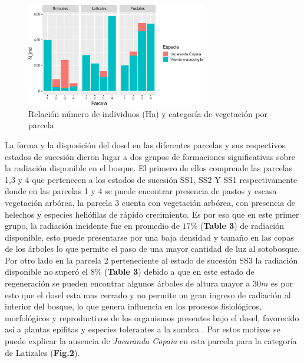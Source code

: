 \documentclass[letterpaper,9pt,onecolumn,twoside,]{pinp}
\begin{document}
\begin{figure}

{\centering \includegraphics[width=0.7\textwidth]{report_ecology_files/figure-latex/unnamed-chunk-10-1} 

}

\caption{Relación número de individuos (Ha) y categoría de vegetación por parcela}\label{fig:unnamed-chunk-10}
\end{figure}

La forma y la disposición del dosel en las diferentes parcelas y sus
respectivos estados de sucesión dieron lugar a dos grupos de formaciones
significativas sobre la radiación disponible en el bosque. El primero de
ellos comprende las parcelas 1,3 y 4 que pertenecen a los estados de
sucesión SS1, SS2 Y SS1 respectivamente donde en las parcelas 1 y 4 se
puede encontrar presencia de pastos y escasa vegetación arbórea, la
parcela 3 cuenta con vegetación arbórea, con presencia de helechos y
especies heliófilas de rápido crecimiento. Es por eso que en este primer
grupo, la radiación incidente fue en promedio de \(17 \%\)
(\textbf{Table 3}) de radiación disponible, esto puede presentarse por
una baja densidad y tamaño en las copas de los árboles\citep{plateros}
lo que permite el paso de una mayor cantidad de luz al sotobosque. Por
otro lado en la parcela 2 perteneciente al estado de sucesión SS3 la
radiación disponible no superó el \(8 \%\) (\textbf{Table 3}) debido a
que en este estado de regeneración se pueden encontrar algunos árboles de
altura mayor a \(30 m\) es por esto que el dosel esta mas cerrado y no
permite un gran ingreso de radiación al interior del bosque, lo que
genera influencia en los procesos fisiológicos, morfológicos y
reproductivos de los organismos presentes bajo el dosel, favorecido así
a plantas epifitas y especies tolerantes a la sombra \citep{plateros}.
Por estos motivos se puede explicar la ausencia de \emph{Jacaranda
Copaia} en esta parcela para la categoría de Latizales (\textbf{Fig.2}).
\end{document}
